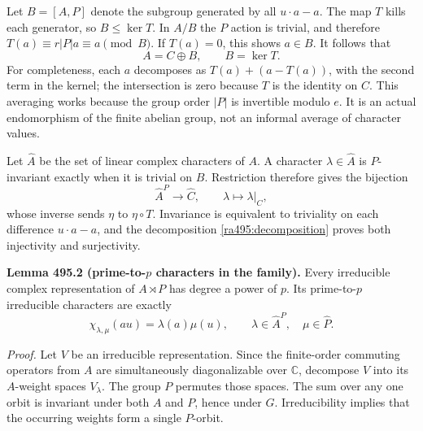 \documentclass[11pt]{article}
\begin{document}
Let $B=[A,P]$ denote the subgroup generated by all $u\cdot a-a$.
The map $T$ kills each generator, so $B\leq\ker T$. In $A/B$ the
$P$ action is trivial, and therefore
$T(a)\equiv r|P|a\equiv a\pmod B$. If $T(a)=0$, this shows
$a\in B$. It follows that
\begin{equation}\label{ra495:decomposition}
 A=C\oplus B,\qquad B=\ker T.
\end{equation}
For completeness, each $a$ decomposes as $T(a)+(a-T(a))$, with the
second term in the kernel; the intersection is zero because $T$ is the
identity on $C$. This averaging works because the group order $|P|$ is
invertible modulo $e$. It is an actual endomorphism of the finite
abelian group, not an informal average of character values.

Let $\widehat A$ be the set of linear complex characters of $A$.
A character $\lambda\in\widehat A$ is $P$-invariant exactly when it
is trivial on $B$. Restriction therefore gives the bijection
\begin{equation}\label{ra495:dualrestriction}
 \widehat A^{P}\longrightarrow\widehat C,
 \qquad\lambda\longmapsto\lambda|_C,
\end{equation}
whose inverse sends $\eta$ to $\eta\circ T$. Invariance is equivalent
to triviality on each difference $u\cdot a-a$, and the decomposition
\eqref{ra495:decomposition} proves both injectivity and surjectivity.

\textbf{Lemma 495.2 (prime-to-$p$ characters in the family).}
Every irreducible complex representation of $A\rtimes P$ has degree a
power of $p$. Its prime-to-$p$ irreducible characters are exactly
\begin{equation}\label{ra495:linearlabels}
 \chi_{\lambda,\mu}(a u)=\lambda(a)\mu(u),
 \qquad \lambda\in\widehat A^{P},\quad\mu\in\widehat P.
\end{equation}

\emph{Proof.}
Let $V$ be an irreducible representation. Since the finite-order commuting
operators from $A$ are simultaneously diagonalizable over $\mathbb C$,
decompose $V$ into its $A$-weight spaces $V_\lambda$. The group $P$
permutes those spaces. The sum over any one orbit is invariant under both
$A$ and $P$, hence under $G$. Irreducibility implies that the occurring
weights form a single $P$-orbit.
\end{document}
